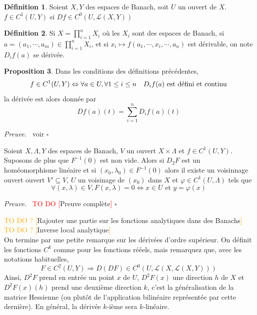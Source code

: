 \documentclass[a4paper,12pt,oneside,titlepage]{article}
\newcommand{\todo}[1]{\textcolor{red}{TO DO [}#1\textcolor{red}{]}}
\newcommand{\todomaybe}[1]{\textcolor{orange}{TO DO ? [}#1\textcolor{orange}{]}}
\theoremstyle{definition}
\newtheorem{definition}{Définition}[section]
\newtheorem{proposition}[definition]{Proposition}
\theoremstyle{plain}
\newenvironment{preuve}
{\par\noindent\textit{Preuve.}\ }
{\hfill$\square$\par}
\begin{document}
\begin{definition}
    Soient $X,Y$ des espaces de Banach, soit $U$ un ouvert de $X$.
    $f\in C^1(U,Y)$ si $Df\in C^0(U,\mathcal{L}(X,Y))$
\end{definition}
\begin{definition}
    Si $X=\prod_{i=1}^n X_i$ où les $X_i$ sont des espaces 
    de Banach, si $a=(a_1,\cdots,a_m)\in\prod_{i=1}^n X_i$,  
    et si $x_i\mapsto f(a_1,\cdots,x_i,\cdots,a_n)$
    est dérivable, on note  $D_{i}f(a)$ se dérivée.
\end{definition}
\begin{proposition}
    Dans les conditions des définitions précédentes, 
    \begin{equation*}
        f\in C^1(U,Y)\Leftrightarrow \forall a\in U, \space
        \forall 1\leq i \leq n \quad  D_i f(a)\text{ est défini et continu}
    \end{equation*}
    la dérivée est alors donnée par
    \begin{equation*}
        Df(a)(t)=\sum_{i=1}^n D_i f(a)(t)
    \end{equation*}
\end{proposition}
\begin{preuve}
    voir \cite{dieudonne1969fma8}
\end{preuve}

\begin{theobox}
Soient $X,\Lambda,Y$ des espaces de Banach, $V$ un ouvert $X\times\Lambda$ et $f\in C^1(U,Y)$. Suposons de plus que $F^{-1}(0)$ est non vide. Alors si $D_2 F$ est un homéomorphisme linéaire et si $(x_0,\lambda_0)\in F^{-1}(0)$ alors il existe un voisinnage ouvert ouvert $V'\subseteq V$, $U$ un voisinage de $(x_0)$ dans $X$ et $\varphi\in C^1(U,\Lambda)$ tels que 
\begin{equation*}
    \forall (x,\lambda)\in V, F(x,\lambda)=0\Leftrightarrow x\in U \text{ et } y=\varphi(x)
\end{equation*}
\end{theobox}
\begin{preuve}
    \todo{Preuve complète}
\end{preuve}


\todomaybe{Rajouter une partie sur les fonctions analytiques dans des Banachs}
\\

\todomaybe{Inverse local analytique}
\\

On termine par une petite remarque sur les dérivées d'ordre supérieur. On définit les fonctions $C^k$ comme pour les fonctions rééels, mais remarquez que, avec les notations habituelles,
\begin{equation*}
    F\in C^2(U,Y)\Rightarrow D(DF)\in C^0(U,\mathcal{L}(X,\mathcal{L}(X,Y)))
\end{equation*}
Ainsi, $D^2F$ prend en entrée un point $x$ de $U$, $D^2F(x)$ une direction $h$ de $X$ et  $D^2F(x)(h)$ prend une deuxième direction $k$, c'est la généralisation de la matrice Hessienne (ou plutôt de l'application bilinéaire représentée par cette dernière). En général, la dérivée $k$-ième sera $k$-linéaire.
\end{document}
